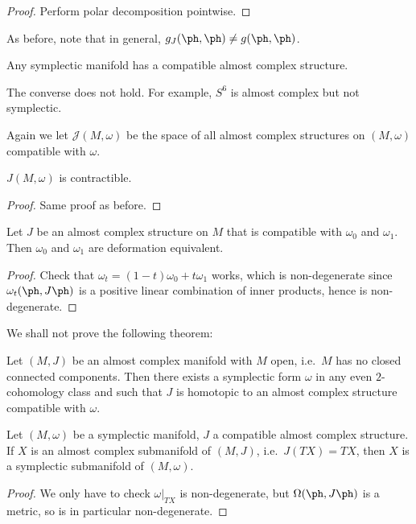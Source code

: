 \documentclass[a4paper]{article}
\begin{document}
\begin{proof}
  Perform polar decomposition pointwise.
\end{proof}

As before, note that in general, $g_J(\ph, \ph)\not= g(\ph, \ph)$.

\begin{cor}
  Any symplectic manifold has a compatible almost complex structure.
\end{cor}

The converse does not hold. For example, $S^6$ is almost complex but not symplectic.

Again we let $\mathcal{J}(M, \omega)$ be the space of all almost complex structures on $(M, \omega)$ compatible with $\omega$.
\begin{prop}
  $J(M, \omega)$ is contractible.
\end{prop}
\begin{proof}
  Same proof as before.
\end{proof}

\begin{prop}
  Let $J$ be an almost complex structure on $M$ that is compatible with $\omega_0$ and $\omega_1$. Then $\omega_0$ and $\omega_1$ are deformation equivalent.
\end{prop}

\begin{proof}
  Check that $\omega_t = (1 - t) \omega_0 + t \omega_1$ works, which is non-degenerate since $\omega_t(\ph, J\ph)$ is a positive linear combination of inner products, hence is non-degenerate.
\end{proof}

We shall not prove the following theorem:
\begin{thm}[Gromov]
  Let $(M, J)$ be an almost complex manifold with $M$ open, i.e.\ $M$ has no closed connected components. Then there exists a symplectic form $\omega$ in any even $2$-cohomology class and such that $J$ is homotopic to an almost complex structure compatible with $\omega$.\fakeqed
\end{thm}

\begin{prop}
  Let $(M, \omega)$ be a symplectic manifold, $J$ a compatible almost complex structure. If $X$ is an almost complex submanifold of $(M, J)$, i.e.\ $J(TX) = TX$, then $X$ is a symplectic submanifold of $(M, \omega)$.
\end{prop}

\begin{proof}
  We only have to check $\omega|_{TX}$ is non-degenerate, but $\Omega(\ph, J\ph)$ is a metric, so is in particular non-degenerate.
\end{proof}
\end{document}
